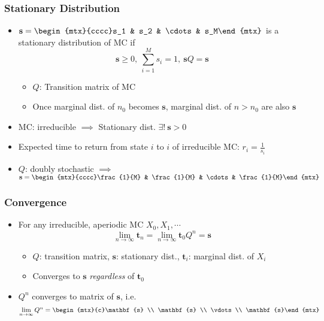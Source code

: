 \subsubsection*{Stationary Distribution}
\begin{itemize}
    \item $\mathbf{s}=\begin{mtx}{cccc}s_1 & s_2 & \cdots & s_M\end{mtx}$ is a stationary distribution of MC if
    \begin{equation}
        \mathbf{s}\geq 0,~\sum_{i=1}^Ms_i=1,~\mathbf{s}Q=\mathbf{s}
    \end{equation}
    \begin{itemize}
        \item $Q$: Transition matrix of MC
        \item Once marginal dist. of $n_0$ becomes $\mathbf{s}$, marginal dist. of $n>n_0$ are also $\mathbf{s}$
    \end{itemize}
    \item MC: irreducible $\implies$ Stationary dist. $\exists!~\mathbf{s}>0$
    \item Expected time to return from state $i$ to $i$ of irreducible MC: $r_i=\frac{1}{s_i}$
    \item $Q$: doubly stochastic $\implies$ $\mathbf{s}=\begin{mtx}{cccc}\frac{1}{M} & \frac{1}{M} & \cdots & \frac{1}{M}\end{mtx}$
\end{itemize}

\subsubsection*{Convergence}
\begin{itemize}
    \item For any irreducible, aperiodic MC $X_0,X_1,\cdots$
    \begin{equation}
        \lim_{n\to\infty}\mathbf{t}_n=\lim_{n\to\infty}\mathbf{t}_0Q^n=\mathbf{s}
    \end{equation}
    \begin{itemize}
        \item $Q$: transition matrix, $\mathbf{s}$: stationary dist., $\mathbf{t}_i$: marginal dist. of $X_i$
        \item Converges to $\mathbf{s}$ \textit{regardless} of $\mathbf{t}_0$
    \end{itemize}
    \item $Q^n$ converges to matrix of $\mathbf{s}$, i.e.
    \begin{equation}
        \lim_{n\to\infty}Q^n=\begin{mtx}{c}\mathbf{s} \\ \mathbf{s} \\ \vdots \\ \mathbf{s}\end{mtx}
    \end{equation}
\end{itemize}

